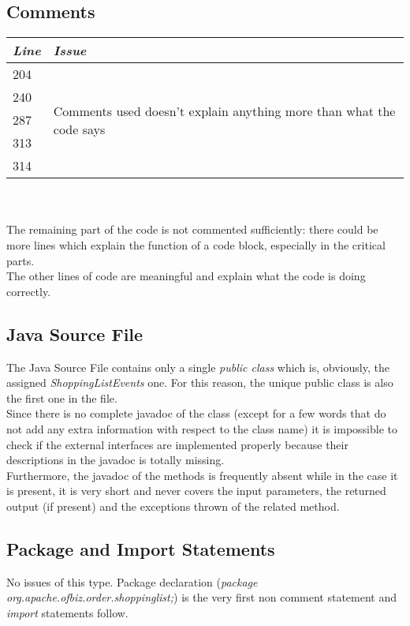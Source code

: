 \documentclass[11pt,a4paper]{report}
\begin{document}
\subsection{Comments}
\begin{tabularx}{\textwidth}{|l|X|}
	\hline
	\textit{Line} & \textit{Issue}\\
	\hline
	204 & \multirow{5}{\linewidth}{Comments used doesn't explain anything more than what the code says}\\
	240 & \\
	287 & \\
	313 & \\
	314 & \\
	\hline
\end{tabularx}
\\\\
The remaining part of the code is not commented sufficiently: there could be more lines which explain the function of a code block, especially in the critical parts.\\The other lines of code are meaningful and explain what the code is doing correctly.
\subsection{Java Source File}
The Java Source File contains only a single \textit{public class} which is, obviously, the assigned \textit{ShoppingListEvents} one. For this reason, the unique public class is also the first one in the file.\\
Since there is no complete javadoc of the class (except for a few words that do not add any extra information with respect to the class name) it is impossible to check if the external interfaces are implemented properly because their descriptions in the javadoc is totally missing.\\
Furthermore, the javadoc of the methods is frequently absent while in the case it is present, it is very short and never covers the input parameters, the returned output (if present) and the exceptions thrown of the related method.
\subsection{Package and Import Statements}
No issues of this type. Package declaration (\textit{package org.apache.ofbiz.order.shoppinglist;}) is the very first non comment statement and \textit{import} statements follow.
\end{document}
